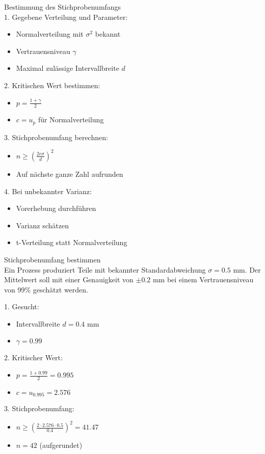 \begin{KR}{Bestimmung des Stichprobenumfangs}\\
1. Gegebene Verteilung und Parameter:
   \begin{itemize}
     \item Normalverteilung mit $\sigma^2$ bekannt
     \item Vertrauensniveau $\gamma$
     \item Maximal zulässige Intervallbreite $d$
   \end{itemize}

2. Kritischen Wert bestimmen:
   \begin{itemize}
     \item $p = \frac{1+\gamma}{2}$
     \item $c = u_p$ für Normalverteilung
   \end{itemize}

3. Stichprobenumfang berechnen:
   \begin{itemize}
     \item $n \geq (\frac{2c\sigma}{d})^2$
     \item Auf nächste ganze Zahl aufrunden
   \end{itemize}

4. Bei unbekannter Varianz:
   \begin{itemize}
     \item Vorerhebung durchführen
     \item Varianz schätzen
     \item t-Verteilung statt Normalverteilung
   \end{itemize}
\end{KR}

\begin{example2}{Stichprobenumfang bestimmen}\\
Ein Prozess produziert Teile mit bekannter Standardabweichung $\sigma = 0.5$ mm. Der Mittelwert soll mit einer Genauigkeit von $\pm 0.2$ mm bei einem Vertrauensniveau von 99\% geschätzt werden.

1. Gesucht:
   \begin{itemize}
     \item Intervallbreite $d = 0.4$ mm
     \item $\gamma = 0.99$
   \end{itemize}

2. Kritischer Wert:
   \begin{itemize}
     \item $p = \frac{1+0.99}{2} = 0.995$
     \item $c = u_{0.995} = 2.576$
   \end{itemize}

3. Stichprobenumfang:
   \begin{itemize}
     \item $n \geq (\frac{2 \cdot 2.576 \cdot 0.5}{0.4})^2 = 41.47$
     \item $n = 42$ (aufgerundet)
   \end{itemize}
\end{example2}

